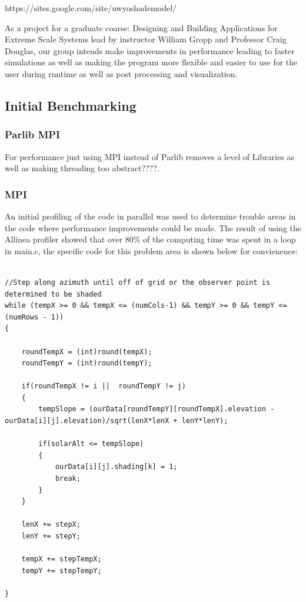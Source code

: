 \documentclass[]{article}%
\begin{document}
https://sites.google.com/site/uwyoshademodel/

As a project for a graduate coarse: Designing and Building Applications for Extreme Scale Systems lead by instructor William Gropp and Professor Craig Douglas, our group intends make improvements in performance leading to faster simulations as well as making the program more flexible and easier to use for the user during runtime as well as post processing and visualization.

\subsection{Initial Benchmarking}

\subsubsection{Parlib MPI}

For performance just using MPI instead of Parlib removes a level of Libraries as well as making threading too abstract????.

\subsubsection{MPI}

An initial profiling of the code in parallel was used to determine trouble areas in the code where performance improvements could be made. The result of using the Allinea profiler showed that over 80\% of the computing time was spent in a loop in main.c, the specific code for this problem area is shown below for convienence:
{\small
\begin{verbatim}

//Step along azimuth until off of grid or the observer point is determined to be shaded
while (tempX >= 0 && tempX <= (numCols-1) && tempY >= 0 && tempY <= (numRows - 1))
{	

	roundTempX = (int)round(tempX);
	roundTempY = (int)round(tempY);			

	if(roundTempX != i ||  roundTempY != j) 
	{
		tempSlope = (ourData[roundTempY][roundTempX].elevation - ourData[i][j].elevation)/sqrt(lenX*lenX + lenY*lenY);	

		if(solarAlt <= tempSlope)
		{	
			ourData[i][j].shading[k] = 1;
			break;
		}
	}												

	lenX += stepX;		
	lenY += stepY;

	tempX += stepTempX;
	tempY += stepTempY;

}
\end{verbatim}}
\end{document}
